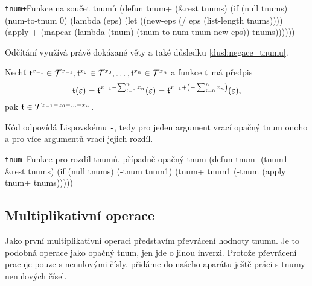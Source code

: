 \begin{lispcode}{\texttt{tnum+}}{Funkce na součet tnumů}
(\textcolor{funkcionalni}{defun} \textcolor{pojmenovan}{tnum+} (&rest tnums)
  (\textcolor{funkcionalni}{if} (\textcolor{funkcionalni}{null} tnums)
    (\textcolor{moje}{num-to-tnum} 0)
    (\textcolor{funkcionalni}{lambda} (eps)
      (\textcolor{vedlejsi}{let} ((new-eps (\textcolor{matematicke}{/} eps (\textcolor{funkcionalni}{list-length} tnums))))
        (\textcolor{funkcionalni}{apply} \textquotesingle\textcolor{moje}{+} 
          (\textcolor{funkcionalni}{mapcar} (\textcolor{funkcionalni}{lambda} (tnum) (\textcolor{moje}{tnum-to-num} tnum new-eps))
            tnums))))))
\end{lispcode}

Odčítání využívá právě dokázané věty a také důsledku \ref{dusl:negace_tnumu}.
\begin{fact}
Nechť $\mathfrak{t}^{x_{-1}}\in\mathcal{T}^{x_{-1}}, \mathfrak{t}^{x_{0}}\in\mathcal{T}^{x_{0}}, \ldots, \mathfrak{t}^{x_{n}}\in\mathcal{T}^{x_{n}}$ a funkce $\mathfrak{t}^{}$ má předpis
\begin{equation}
\mathfrak{t}^{}(\varepsilon)=\mathfrak{t}^{x_{-1}-\sum_{i=0}^nx_n}(\varepsilon)=\mathfrak{t}^{x_{-1}+\left(-\sum_{i=0}^nx_n\right)}(\varepsilon),
\end{equation}
pak $\mathfrak{t}^{}\in\mathcal{T}^{x_{-1}-x_0-\ldots -x_n}$.
\end{fact}

Kód odpovídá Lispovskému \texttt{-}, tedy pro jeden argument vrací opačný tnum onoho a pro více argumentů vrací jejich rozdíl.

\begin{lispcode}{\texttt{tnum-}}{Funkce pro rozdíl tnumů, případně opačný tnum}
(\textcolor{funkcionalni}{defun} \textcolor{pojmenovan}{tnum-} (tnum1 &rest tnums)
  (\textcolor{funkcionalni}{if} (\textcolor{funkcionalni}{null} tnums)
    (\textcolor{moje}{-tnum} tnum1)
    (\textcolor{moje}{tnum+} tnum1 (\textcolor{moje}{-tnum} (\textcolor{funkcionalni}{apply} \textquotesingle\textcolor{moje}{tnum+} tnums)))))
\end{lispcode}

\subsection{Multiplikativní operace}
Jako první multiplikativní operaci představím převrácení hodnoty tnumu. Je to podobná operace jako opačný tnum, jen jde o jinou inverzi. Protože převrácení pracuje pouze s nenulovými čísly, přidáme do našeho aparátu ještě práci s tnumy nenulových čísel.

